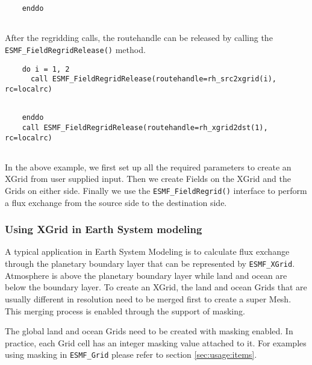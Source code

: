  \begin{verbatim}
    enddo
 
\end{verbatim}
 

   After the regridding calls, the routehandle can be released by calling the
   {\tt ESMF\_FieldRegridRelease()} method. 

 \begin{verbatim}
    do i = 1, 2
      call ESMF_FieldRegridRelease(routehandle=rh_src2xgrid(i), rc=localrc)
 
\end{verbatim}
 

 \begin{verbatim}
    enddo
    call ESMF_FieldRegridRelease(routehandle=rh_xgrid2dst(1), rc=localrc)
 
\end{verbatim}
 
 

   In the above example, we first set up all the required parameters to create an XGrid from user
   supplied input. Then we create Fields on the XGrid and the Grids on either side. Finally
   we use the {\tt ESMF\_FieldRegrid()} interface to perform a flux exchange from the source side
   to the destination side. 

  \subsubsection{Using XGrid in Earth System modeling}
  \label{sec:xgrid:usage:xgrid_create_masking}
  
   A typical application in Earth System Modeling is to calculate flux exchange
   through the planetary boundary layer that can be represented by {\tt ESMF\_XGrid}.
   Atmosphere is above the planetary boundary layer while land and ocean are below the boundary layer.
   To create an XGrid, the land and ocean Grids that are usually different in resolution
   need to be merged first to create a super Mesh. This merging process is enabled through the support
   of masking.
  
   The global land and ocean Grids need to be created with masking enabled.
   In practice, each Grid cell has an integer masking value attached to it. For examples using masking in
   {\tt ESMF\_Grid} please refer to section \ref{sec:usage:items}.
  
